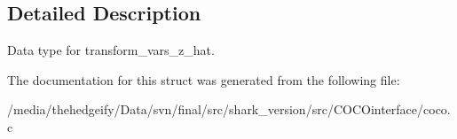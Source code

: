 \subsection{Detailed Description}
Data type for transform\+\_\+vars\+\_\+z\+\_\+hat. 

The documentation for this struct was generated from the following file\+:\begin{DoxyCompactItemize}
\item 
/media/thehedgeify/\+Data/svn/final/src/shark\+\_\+version/src/\+C\+O\+C\+Ointerface/coco.\+c\end{DoxyCompactItemize}
